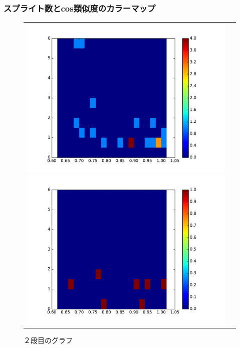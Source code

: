 \documentclass[twocolumn,9pt,a4paper]{jsarticle}
\begin{document}
\subsubsection{スプライト数とcos類似度のカラーマップ}
\begin{figure}[h]
 \begin{tabular}{cc}
 	\begin{minipage}[t]{0.45\hsize}
	 \centering
	 \includegraphics[keepaspectratio, scale = 0.2]{colormap_maze_splite_1.pdf}
	 \caption{１段目のグラフ}
	 \label{first_splite}
	\end{minipage}
        \begin{minipage}[t]{0.45\hsize}
	 \centering
	 \includegraphics[keepaspectratio, scale = 0.2]{colormap_maze_splite_2.pdf}
	 \caption{２段目のグラフ}
	 \label{second_splite}
	\end{minipage}
 \end{tabular}
 \end{figure}
\end{document}
